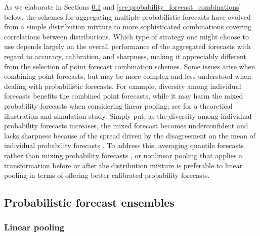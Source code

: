 \documentclass[11pt]{article}
\begin{document}
As we elaborate in Sections \ref{sec:probabilistic_forecast_ensembles} and \ref{sec:probability_forecast_combinations} below, the schemes for aggregating multiple probabilistic forecasts have evolved from a simple distribution mixture to more sophisticated combinations covering correlations between distributions. Which type of strategy one might choose to use depends largely on the overall performance of the aggregated forecasts with regard to accuracy, calibration, and sharpness, making it appreciably different from the selection of point forecast combination schemes. Some issues arise when combining point forecasts, but may be more complex and less understood when dealing with probabilistic forecasts. For example, diversity among individual forecasts benefits the combined point forecasts, while it may harm the mixed probability forecasts when considering linear pooling; see \cite{Ranjan2010-jl} for a theoretical illustration and simulation study. Simply put, as the diversity among individual probability forecasts increases, the mixed forecast becomes underconfident and lacks sharpness because of the spread driven by the disagreement on the mean of individual probability forecasts \citep{Hora2004-fz,Wallis2005-yf,Ranjan2010-jl}. To address this, averaging quantile forecasts rather than mixing probability forecasts \citep{Lichtendahl2013-rt}, or nonlinear pooling that applies a transformation before or after the distribution mixture \citep{Ranjan2010-jl,Gneiting2013-hl} is preferable to linear pooling in terms of offering better calibrated probability forecasts.

\subsection{Probabilistic forecast ensembles}
\label{sec:probabilistic_forecast_ensembles}

\subsubsection{Linear pooling}
\label{sec:linear_pooling}
\end{document}
